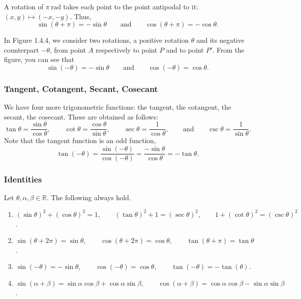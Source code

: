 \documentclass[11pt]{book}
\theoremstyle{break}
\theoremstyle{no_label}
\newcommand{\bbR}{\mathbb{R}}
\numberwithin{equation}{section}
\begin{document}
\vspace*{1.5em}

A rotation of $\pi\ \text{rad}$ takes each point to the point antipodal to it: $(x, y)\mapsto(-x, -y)$. Thus, $$\sin(\theta+\pi)=-\sin\theta\qquad\text{and}\qquad\cos(\theta+\pi)=-\cos\theta.$$

In Figure 1.4.4, we consider two rotations, a positive rotation $\theta$ and its negative counterpart $-\theta$, from point $A$ respectively to point $P$ and to point $P'$. From the figure, you can see that $$\sin(-\theta)=-\sin\theta\qquad\text{and}\qquad\cos(-\theta)=\cos\theta.$$

\subsubsection*{Tangent, Cotangent, Secant, Cosecant}

We have four more trigonometric functions: the tangent, the cotangent, the secant, the cosecant. These are obtained as follows: $$\tan\theta=\dfrac{\sin\theta}{\cos\theta},\qquad\cot\theta=\dfrac{\cos\theta}{\sin\theta},\qquad\sec\theta=\dfrac{1}{\cos\theta},\qquad\text{and}\qquad\csc\theta=\dfrac{1}{\sin\theta}.$$ Note that the tangent function is an odd function, $$\tan(-\theta)=\dfrac{\sin(-\theta)}{\cos(-\theta)}=\dfrac{-\sin\theta}{\cos\theta}=-\tan\theta.$$

\subsubsection*{Identities}

\begin{theorem}
    Let $\theta, \alpha, \beta\in\bbR$. The following always hold.
    \begin{enumerate}
        \item $(\sin\theta)^2+(\cos\theta)^2=1, \qquad (\tan\theta)^2+1=(\sec\theta)^2,\qquad 1+(\cot\theta)^2=(\csc\theta)^2$.
        \item $\sin(\theta+2\pi)=\sin\theta,\qquad\cos(\theta+2\pi)=\cos\theta,\qquad\tan(\theta+\pi)=\tan\theta$.
        \item $\sin(-\theta)=-\sin\theta,\qquad\cos(-\theta)=\cos\theta,\qquad\tan(-\theta)=-\tan(\theta)$.
        \item $\sin(\alpha+\beta)=\sin\alpha\cos\beta+\cos\alpha\sin\beta,\qquad\cos(\alpha+\beta)=\cos\alpha\cos\beta-\sin\alpha\sin\beta$.
    \end{enumerate}
\end{theorem}
\end{document}
